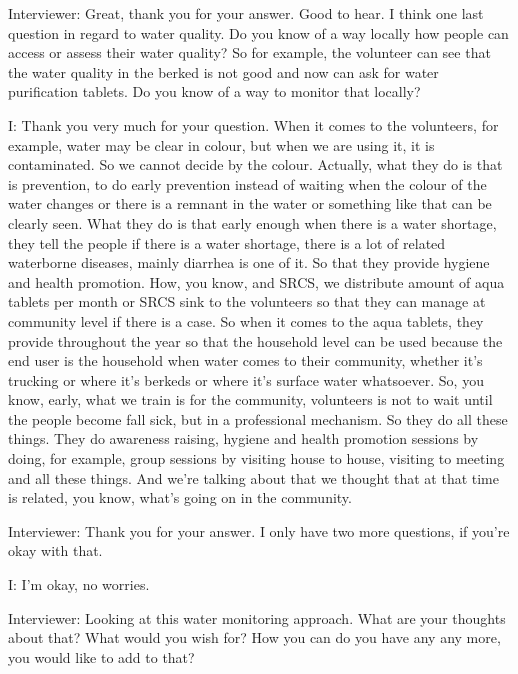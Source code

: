 Interviewer:  Great, thank you for your answer. Good to hear. I think one last question in regard to water quality. Do you know of a way locally how people can access or assess their water quality? So for example, the volunteer can see that the water quality in the berked is not good and now can ask for water purification tablets. Do you know of a way to monitor that locally?

I:  Thank you very much for your question. When it comes to the volunteers, for example, water may be clear in colour, but when we are using it, it is contaminated. So we cannot decide by the colour. Actually, what they do is that is prevention, to do early prevention instead of waiting when the colour of the water changes or there is a remnant in the water or something like that can be clearly seen. What they do is that early enough when there is a water shortage, they tell the people if there is a water shortage, there is a lot of related waterborne diseases, mainly diarrhea is one of it. So that they provide hygiene and health promotion. How, you know, and SRCS, we distribute amount of aqua tablets per month or SRCS sink to the volunteers so that they can manage at community level if there is a case. So when it comes to the aqua tablets, they provide throughout the year so that the household level can be used because the end user is the household when water comes to their community, whether it's trucking or where it's berkeds or where it's surface water whatsoever. So, you know, early, what we train is for the community, volunteers is not to wait until the people become fall sick, but in a professional mechanism. So they do all these things. They do awareness raising, hygiene and health promotion sessions by doing, for example, group sessions by visiting house to house, visiting to meeting and all these things. And we're talking about that we thought that at that time is related, you know, what's going on in the community.

Interviewer:   Thank you for your answer. I only have two more questions, if you're okay with that. 

I: I'm okay, no worries. 

Interviewer:  Looking at this water monitoring approach. What are your thoughts about that? What would you wish for? How you can do you have any any more, you would like to add to that? 

